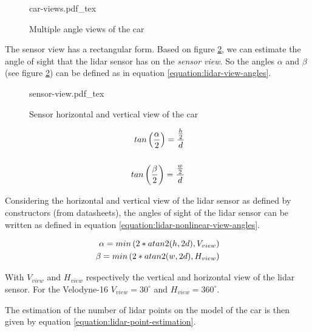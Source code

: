 \documentclass{scrartcl}
\newcommand{\fig}[3][100]{
  \def\svgwidth{#1mm}
  {#3.pdf_tex}
}
\begin{document}
  \begin{figure}[h]
    \centering
    \fig[160]{pictures/car-views}{car-views}
    \caption{Multiple angle views of the car}
    \label{figure:car-views}
  \end{figure}

  The sensor view has a rectangular form. Based on figure
  \ref{figure:sensor-view}, we can estimate
  the angle of sight that the lidar sensor has on the \textit{sensor view}.
  So the angles $\alpha$ and $\beta$ (see figure \ref{figure:sensor-view})
  can be defined as in equation \ref{equation:lidar-view-angles}.

  \begin{figure}[h]
    \centering
    \fig[120]{pictures/sensor-view}{sensor-view}
    \caption{Sensor horizontal and vertical view of the car}
    \label{figure:sensor-view}
  \end{figure}

  \begin{equation}
    \centering
    \begin{aligned}
      tan\left( \frac{\alpha}{2} \right) = \frac{\frac{h}{2}}{d} \\
      \\
      tan\left( \frac{\beta}{2} \right) = \frac{\frac{w}{2}}{d}
    \end{aligned}
    \label{equation:lidar-view-angles}
  \end{equation}

  Considering the horizontal and vertical view of the lidar sensor as
  defined by constructors (from datasheets), the angles of sight of the
  lidar sensor can be written as defined in equation
  \ref{equation:lidar-nonlinear-view-angles}.

  \begin{equation}
    \centering
    \begin{aligned}
      \alpha =  min \left( 2 * atan2(h, 2d), V_{view} \right) \\
      \beta = min \left( 2 * atan2(w, 2d), H_{view} \right)
    \end{aligned}
    \label{equation:lidar-nonlinear-view-angles}
  \end{equation}

  With $V_{view}$ and $H_{view}$ respectively the vertical and horizontal view
  of the lidar sensor. For the Velodyne-16 $V_{view} = 30^{\circ}$ and
  $H_{view} = 360^{\circ}$.

  The estimation of the number of lidar points on the model of the car is then
  given by equation \ref{equation:lidar-point-estimation}.
\end{document}
